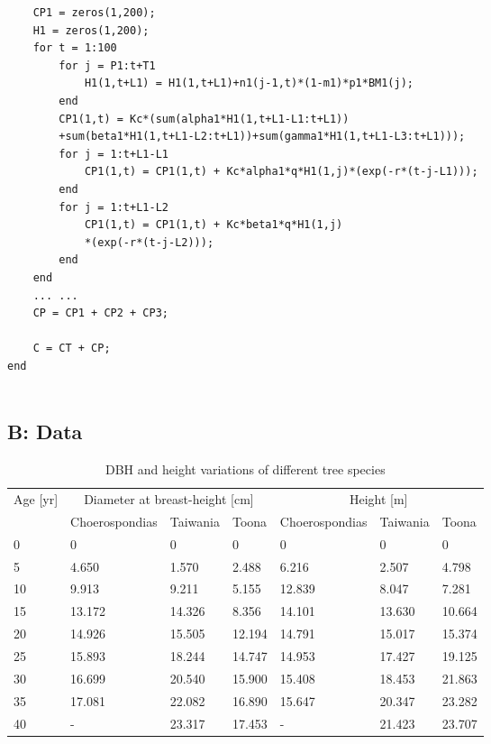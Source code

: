 \begin{lstlisting}
    CP1 = zeros(1,200);
    H1 = zeros(1,200);
    for t = 1:100
        for j = P1:t+T1
            H1(1,t+L1) = H1(1,t+L1)+n1(j-1,t)*(1-m1)*p1*BM1(j);
        end
        CP1(1,t) = Kc*(sum(alpha1*H1(1,t+L1-L1:t+L1))
        +sum(beta1*H1(1,t+L1-L2:t+L1))+sum(gamma1*H1(1,t+L1-L3:t+L1)));
        for j = 1:t+L1-L1
            CP1(1,t) = CP1(1,t) + Kc*alpha1*q*H1(1,j)*(exp(-r*(t-j-L1)));
        end
        for j = 1:t+L1-L2
            CP1(1,t) = CP1(1,t) + Kc*beta1*q*H1(1,j)
            *(exp(-r*(t-j-L2)));
        end
    end
    ... ...
    CP = CP1 + CP2 + CP3;
    
    C = CT + CP;
end


\end{lstlisting}


\subsection{B: Data}

\begin{table}[ht]
\centering
\caption{DBH and height variations of different tree species}
\begin{tabular}{lllllll} 
\hline
\multirow{2}{*}{Age [yr]} & \multicolumn{3}{c}{Diameter at breast-height [cm]} & \multicolumn{3}{c}{Height [m]}      \\
                          & Choerospondias & Taiwania & Toona                  & Choerospondias & Taiwania & Toona   \\ 
\hline
0                         & 0              & 0        & 0                      & 0              & 0        & 0       \\
5                         & 4.650          & 1.570    & 2.488                  & 6.216          & 2.507    & 4.798   \\
10                        & 9.913          & 9.211    & 5.155                  & 12.839         & 8.047    & 7.281   \\
15                        & 13.172         & 14.326   & 8.356                  & 14.101         & 13.630   & 10.664  \\
20                        & 14.926         & 15.505   & 12.194                 & 14.791         & 15.017   & 15.374  \\
25                        & 15.893         & 18.244   & 14.747                 & 14.953         & 17.427   & 19.125  \\
30                        & 16.699         & 20.540   & 15.900                 & 15.408         & 18.453   & 21.863  \\
35                        & 17.081         & 22.082   & 16.890                 & 15.647         & 20.347   & 23.282  \\
40                        & -              & 23.317   & 17.453                 & -              & 21.423   & 23.707  \\
\hline
\end{tabular}
\end{table}

